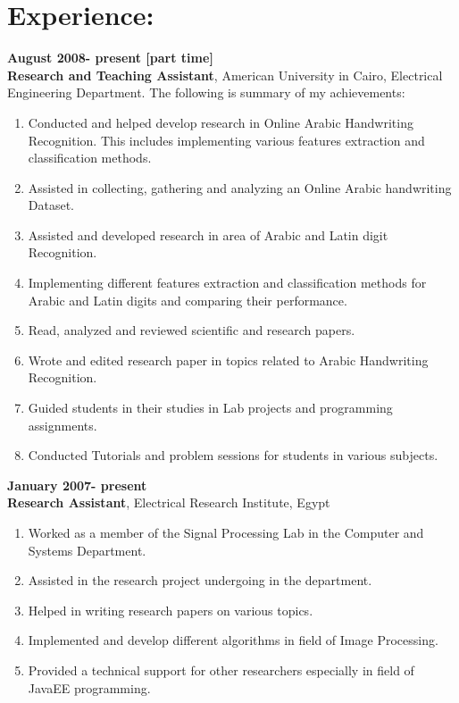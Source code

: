 \documentclass{article}
\begin{document}
 \section*{Experience:}
 \textbf{August 2008- present   [part time]}\\
 \textbf{Research and Teaching Assistant}, American University in Cairo, Electrical Engineering Department.
 The following is summary of my achievements:
 \begin{enumerate}
   \item Conducted and helped develop research in Online Arabic Handwriting Recognition. This includes implementing various features extraction and classification methods.
   \item Assisted in collecting, gathering and analyzing an Online Arabic handwriting Dataset.
   \item Assisted and developed research in area of Arabic and Latin digit Recognition.
 \item Implementing different features extraction and classification methods for Arabic and Latin digits and comparing their performance.
 \item Read, analyzed and reviewed scientific and research papers.
 \item Wrote and edited research paper in topics related to Arabic Handwriting Recognition.
 \item Guided students in their studies in Lab projects and programming assignments.
 \item Conducted Tutorials and problem sessions for students in various subjects.
\end{enumerate}

 \textbf{January 2007- present}\\
 \textbf{Research Assistant}, Electrical Research Institute, Egypt
 \begin{enumerate}
\item Worked as a member of the Signal Processing Lab in the Computer and Systems Department.
 \item Assisted in the research project undergoing in the department.
 \item Helped in writing research papers on various topics.
 \item Implemented and develop different algorithms in field of Image Processing.
 \item Provided a technical support for other researchers especially in field of JavaEE programming.
\end{enumerate}
\end{document}
